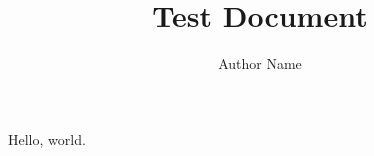 \documentclass{article}
\title{Test Document}
\author{Author Name}
\begin{document}
Hello, world.
\end{document}
